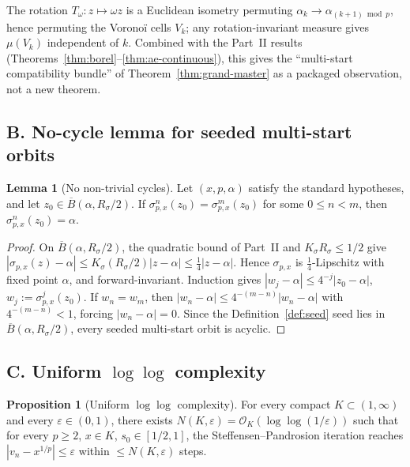 \documentclass[11pt,a4paper]{article}
\theoremstyle{definition}
\newtheorem{lemma}[theorem]{Lemma}
\newtheorem{proposition}{Proposition}[section]
\begin{document}
The rotation $T_\omega : z \mapsto \omega z$ is a Euclidean isometry permuting $\alpha_k \to \alpha_{(k+1)\bmod p}$, hence permuting the Voronoï cells $V_k$; any rotation-invariant measure gives $\mu(V_k)$ independent of $k$. Combined with the Part~II results (Theorems~\ref{thm:borel}--\ref{thm:ae-continuous}), this gives the ``multi-start compatibility bundle'' of Theorem~\ref{thm:grand-master} as a packaged observation, not a new theorem.

\subsection*{B. No-cycle lemma for seeded multi-start orbits}

\begin{lemma}[No non-trivial cycles]\label{thm:no-cycle}
Let $(x, p, \alpha)$ satisfy the standard hypotheses, and let $z_0 \in \overline{B}(\alpha, R_\sigma/2)$. If $\sigma_{p,x}^n(z_0) = \sigma_{p,x}^m(z_0)$ for some $0 \leq n < m$, then $\sigma_{p,x}^n(z_0) = \alpha$.
\end{lemma}

\begin{proof}
On $\overline{B}(\alpha, R_\sigma/2)$, the quadratic bound of Part~II and $K_\sigma R_\sigma \leq 1/2$ give $|\sigma_{p,x}(z) - \alpha| \leq K_\sigma(R_\sigma/2)|z-\alpha| \leq \tfrac14|z - \alpha|$. Hence $\sigma_{p,x}$ is $\tfrac14$-Lipschitz with fixed point $\alpha$, and forward-invariant. Induction gives $|w_j - \alpha| \leq 4^{-j}|z_0 - \alpha|$, $w_j := \sigma_{p,x}^j(z_0)$. If $w_n = w_m$, then $|w_n - \alpha| \leq 4^{-(m-n)}|w_n - \alpha|$ with $4^{-(m-n)} < 1$, forcing $|w_n - \alpha| = 0$. Since the Definition~\ref{def:seed} seed lies in $\overline{B}(\alpha, R_\sigma/2)$, every seeded multi-start orbit is acyclic.
\end{proof}

\subsection*{C. Uniform $\log\log$ complexity}

\begin{proposition}[Uniform $\log\log$ complexity]\label{thm:uniform-loglog}
For every compact $K \subset (1, \infty)$ and every $\varepsilon \in (0, 1)$, there exists $N(K, \varepsilon) = \mathcal{O}_K(\log\log(1/\varepsilon))$ such that for every $p \geq 2$, $x \in K$, $s_0 \in [1/2, 1]$, the Steffensen--Pandrosion iteration reaches $|v_n - x^{1/p}| \leq \varepsilon$ within $\leq N(K, \varepsilon)$ steps.
\end{proposition}
\end{document}
